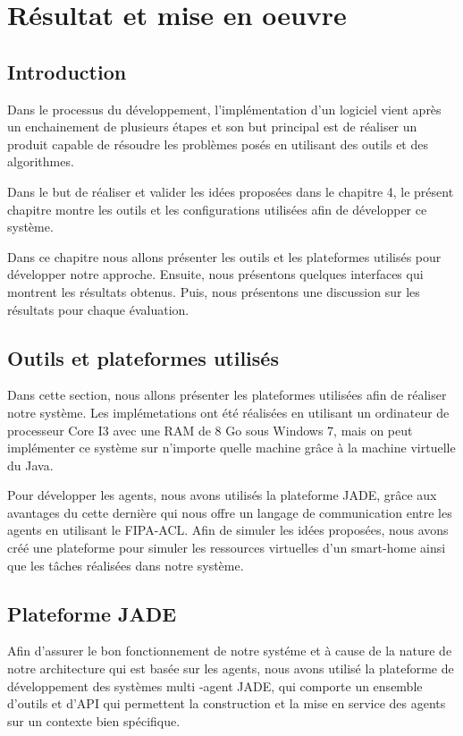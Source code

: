 \chapter{Résultat et mise en oeuvre}

\section{Introduction}
Dans le processus du développement, l’implémentation d’un logiciel vient après un enchainement de plusieurs étapes et son but principal est de réaliser un produit capable de résoudre les problèmes posés en utilisant des outils et des algorithmes.


Dans le but de réaliser et valider les idées proposées dans le chapitre 4, le présent chapitre montre les outils et les configurations utilisées afin de développer ce système.


Dans ce chapitre nous allons présenter les outils et les plateformes utilisés pour développer notre approche. Ensuite, nous présentons quelques interfaces qui montrent les résultats obtenus. Puis, nous présentons une discussion sur les résultats pour chaque évaluation.
\section{Outils et plateformes utilisés}
Dans cette section, nous allons présenter les plateformes utilisées afin de réaliser notre système. Les implémetations ont été réalisées en utilisant un ordinateur de processeur Core I3 avec une RAM de 8 Go sous Windows 7, mais on peut implémenter ce système sur n’importe quelle machine grâce à la machine virtuelle du Java.

Pour développer les agents, nous avons utilisés la plateforme JADE, grâce aux avantages du cette dernière qui nous offre un langage de communication entre les agents en utilisant le FIPA-ACL. Afin de simuler les idées proposées, nous avons créé une plateforme pour simuler les ressources virtuelles d’un smart-home ainsi que les tâches réalisées dans notre système.
\section{Plateforme JADE}
Afin d’assurer le bon fonctionnement de notre systéme et à cause de la nature de notre architecture qui est basée sur les agents, nous avons utilisé la plateforme de développement des systèmes multi -agent JADE, qui comporte un ensemble d’outils et d’API qui permettent la construction et la mise en service des agents sur un contexte bien spécifique.
